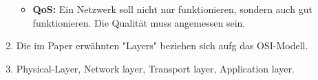\begin{enumerate}[label=\arabic*)]
\begin{itemize}
            \item \textbf{QoS:} Ein Netzwerk soll nicht nur funktionieren, sondern auch gut funktionieren. Die Qualität muss angemessen sein.
        \end{itemize}
        
        \item Die im Paper erwähnten "Layers" beziehen sich aufg das OSI-Modell.
        
        \item Physical-Layer, Network layer, Transport layer, Application layer.
    \end{enumerate}


